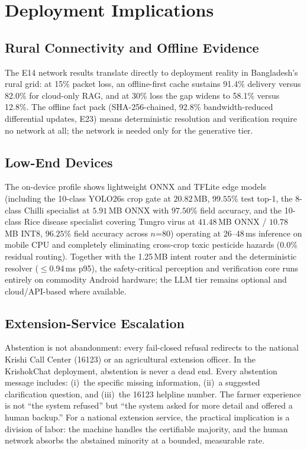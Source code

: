 \section{Deployment Implications}
\label{sec:deployment_implications}

\subsection{Rural Connectivity and Offline Evidence}
The E14 network results translate directly to deployment reality in Bangladesh's rural grid: at 15\% packet loss, an offline-first cache sustains 91.4\% delivery versus 82.0\% for cloud-only RAG, and at 30\% loss the gap widens to 58.1\% versus 12.8\%. The offline fact pack (SHA-256-chained, 92.8\% bandwidth-reduced differential updates, E23) means deterministic resolution and verification require no network at all; the network is needed only for the generative tier.

\subsection{Low-End Devices}
The on-device profile shows lightweight ONNX and TFLite edge models (including the 10-class YOLO26s crop gate at $20.82$\,MB, $99.55\%$ test top-1, the 8-class Chilli specialist at $5.91$\,MB ONNX with $97.50\%$ field accuracy, and the 10-class Rice disease specialist covering Tungro virus at $41.48$\,MB ONNX / $10.78$\,MB INT8, $96.25\%$ field accuracy across $n$=80) operating at 26--48\,ms inference on mobile CPU and completely eliminating cross-crop toxic pesticide hazards ($0.0\%$ residual routing). Together with the 1.25\,MB intent router and the deterministic resolver ($\le$0.94\,ms p95), the safety-critical perception and verification core runs entirely on commodity Android hardware; the LLM tier remains optional and cloud/API-based where available.

\subsection{Extension-Service Escalation}
Abstention is not abandonment: every fail-closed refusal redirects to the national Krishi Call Center (16123) or an agricultural extension officer. In the KrishokChat deployment, abstention is never a dead end. Every abstention message includes: (i)~the specific missing information, (ii)~a suggested clarification question, and (iii)~the 16123 helpline number. The farmer experience is not ``the system refused'' but ``the system asked for more detail and offered a human backup.'' For a national extension service, the practical implication is a division of labor: the machine handles the certifiable majority, and the human network absorbs the abstained minority at a bounded, measurable rate.

